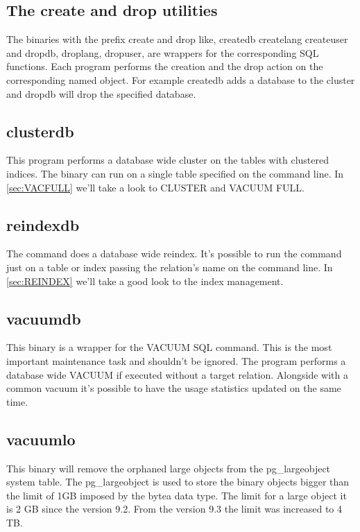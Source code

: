 \subsection{The create and drop utilities}
The  binaries with the prefix create and drop like, createdb createlang createuser and dropdb, 
droplang, dropuser, are wrappers for the corresponding SQL functions. Each program performs the 
creation and the drop action on the corresponding named object. For example createdb adds a 
database to the cluster and dropdb will drop the specified database. 

\subsection{clusterdb}
This program performs a database wide cluster on the tables with clustered indices. 
The binary can run on a single table specified on the command line. In \ref{sec:VACFULL} we'll 
take a look to CLUSTER and VACUUM FULL.

\subsection{reindexdb}
The command does a database wide reindex. It's possible to run the command just on a table or index 
passing the relation's name on the command line. In \ref{sec:REINDEX} we'll take a good look to 
the index management.

\subsection{vacuumdb}
This binary is a wrapper for the VACUUM  SQL command. This is the most important 
maintenance task and shouldn't be ignored. The program performs a database wide VACUUM if executed 
without a target relation. Alongside with a common vacuum it's possible to have the usage 
statistics updated on the same time.

\subsection{vacuumlo}
This binary will remove the orphaned large objects from the pg\_largeobject system table. The 
pg\_largeobject is used to store the binary objects bigger than the limit of 1GB imposed by the 
bytea data type. The limit for a large object it is 2 GB since the version 9.2. From the version 
9.3 the limit was increased to 4 TB. 

